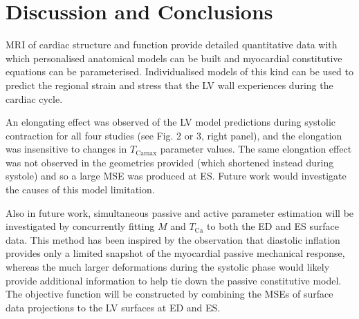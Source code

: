 \documentclass{llncs}
\begin{document}
\section{Discussion and Conclusions}
MRI of cardiac structure and function provide detailed quantitative data with which personalised anatomical models can be built and myocardial constitutive equations can be parameterised. Individualised models of this kind can be used to predict the regional strain and stress that the LV wall experiences during the cardiac cycle. 

An elongating effect was observed of the LV model predictions during systolic contraction for all four studies (see Fig. 2 or 3, right panel), and the elongation was insensitive to changes in $T_{\mathrm{Camax}}$ parameter values. The same elongation effect was not observed in the geometries provided (which shortened instead during systole) and so a large MSE was produced at ES. Future work would investigate the causes of this model limitation. 

Also in future work, simultaneous passive and active parameter estimation will be investigated by concurrently fitting $M$ and $T_{\mathrm{Ca}}$ to both the ED and ES surface data. This method has been inspired by the observation that diastolic inflation provides only a limited snapshot of the myocardial passive mechanical response, whereas the much larger deformations during the systolic phase would likely provide additional information to help tie down the passive constitutive model. The objective function will be constructed by combining the MSEs of surface data projections to the LV surfaces at ED and ES. 
\end{document}
